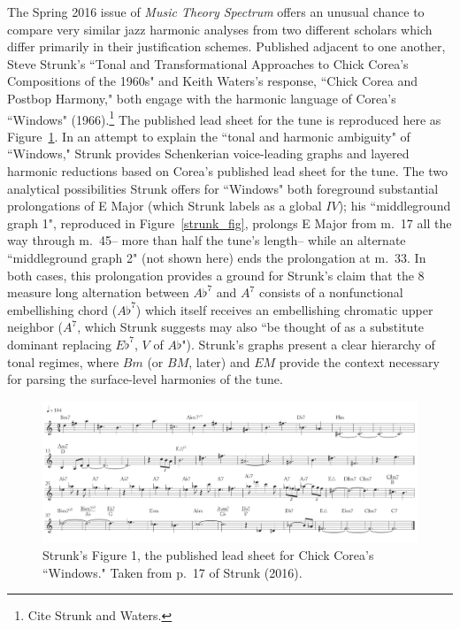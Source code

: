 The Spring 2016 issue of \emph{Music Theory Spectrum} offers an unusual chance to compare very similar jazz harmonic analyses from two different scholars which differ primarily in their justification schemes.  Published adjacent to one another, Steve Strunk's ``Tonal and Transformational Approaches to Chick Corea's Compositions of the 1960s" and Keith Waters's response, ``Chick Corea and Postbop Harmony," both engage with the harmonic language of Corea's ``Windows" (1966).\footnote{Cite Strunk and Waters.}  The published lead sheet for the tune is reproduced here as Figure~\ref{windows}.  In an attempt to explain the ``tonal and harmonic ambiguity" of ``Windows," Strunk provides Schenkerian voice-leading graphs and layered harmonic reductions based on Corea's published lead sheet for the tune.  The two analytical possibilities Strunk offers for ``Windows" both foreground substantial prolongations of E Major (which Strunk labels as a global $IV$); his ``middleground graph 1", reproduced in Figure~\ref{strunk_fig}, prolongs E Major from m.\ 17 all the way through m.\ 45-- more than half the tune's length-- while an alternate ``middleground graph 2" (not shown here) ends the prolongation at m.\ 33.  In both cases, this prolongation provides a ground for Strunk's claim that the 8 measure long alternation between $A\flat^7$ and $A^7$ consists of a nonfunctional embellishing chord ($A\flat^7$) which itself receives an embellishing chromatic upper neighbor ($A^7$, which Strunk suggests may also ``be thought of as a substitute dominant replacing $E\flat^7$, $V$ of $A\flat$").  Strunk's graphs present a clear hierarchy of tonal regimes, where $Bm$ (or $BM$, later) and $EM$ provide the context necessary for parsing the surface-level harmonies of the tune.

\begin{figure}
	\centering
	\caption{Strunk's Figure 1, the published lead sheet for Chick Corea's ``Windows."  Taken from p.\ 17 of Strunk (2016).}\label{windows}
	\includegraphics[width=6.4in]{strunk_windows.png}	
\end{figure}


